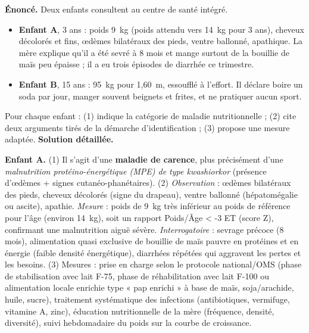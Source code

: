 \documentclass[11pt]{article}
\begin{document}
\begin{exoresolu}
\textbf{Énoncé.} Deux enfants consultent au centre de santé intégré.
\begin{itemize}
  \item \textbf{Enfant A}, 3 ans : poids 9~kg (poids attendu vers 14~kg pour 3 ans), cheveux décolorés et fins, œdèmes bilatéraux des pieds, ventre ballonné, apathique. La mère explique qu'il a été sevré à 8 mois et mange surtout de la bouillie de maïs peu épaisse ; il a eu trois épisodes de diarrhée ce trimestre.
  \item \textbf{Enfant B}, 15 ans : 95~kg pour 1,60~m, essoufflé à l'effort. Il déclare boire un soda par jour, manger souvent beignets et frites, et ne pratiquer aucun sport.
\end{itemize}
Pour chaque enfant : (1) indique la catégorie de maladie nutritionnelle ; (2) cite deux arguments tirés de la démarche d'identification ; (3) propose une mesure adaptée.
\tcblower
\textbf{Solution détaillée.}

\textbf{Enfant A.} (1) Il s'agit d'une \textbf{maladie de carence}, plus précisément d'une \emph{malnutrition protéino-énergétique (MPE) de type kwashiorkor} (présence d'œdèmes + signes cutanéo-phanétaires). (2) \emph{Observation} : œdèmes bilatéraux des pieds, cheveux décolorés (signe du drapeau), ventre ballonné (hépatomégalie ou ascite), apathie. \emph{Mesure} : poids de 9~kg très inférieur au poids de référence pour l'âge (environ 14~kg), soit un rapport Poids/Âge < -3 ET (score Z), confirmant une malnutrition aiguë sévère. \emph{Interrogatoire} : sevrage précoce (8 mois), alimentation quasi exclusive de bouillie de maïs pauvre en protéines et en énergie (faible densité énergétique), diarrhées répétées qui aggravent les pertes et les besoins. (3) Mesures : prise en charge selon le protocole national/OMS (phase de stabilisation avec lait F-75, phase de réhabilitation avec lait F-100 ou alimentation locale enrichie type « pap enrichi » à base de maïs, soja/arachide, huile, sucre), traitement systématique des infections (antibiotiques, vermifuge, vitamine A, zinc), éducation nutritionnelle de la mère (fréquence, densité, diversité), suivi hebdomadaire du poids sur la courbe de croissance.


\end{exoresolu}
\end{document}
